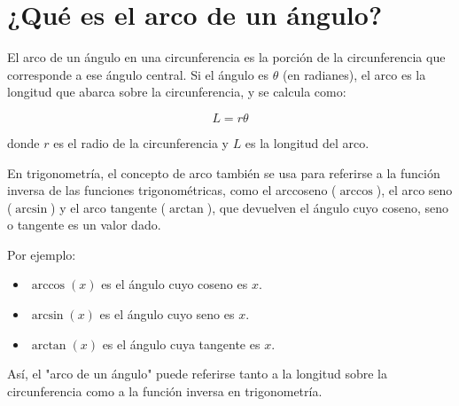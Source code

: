 \section{¿Qué es el arco de un ángulo?}\label{sec:arcoangulo}

El arco de un ángulo en una circunferencia es la porción de la circunferencia que corresponde a ese ángulo central. Si el ángulo es $\theta$ (en radianes), el arco es la longitud que abarca sobre la circunferencia, y se calcula como:

\[
    L = r \theta
\]

donde $r$ es el radio de la circunferencia y $L$ es la longitud del arco.

En trigonometría, el concepto de arco también se usa para referirse a la función inversa de las funciones trigonométricas, como el arccoseno ($\arccos$), el arco seno ($\arcsin$) y el arco tangente ($\arctan$), que devuelven el ángulo cuyo coseno, seno o tangente es un valor dado.

Por ejemplo:
\begin{itemize}
    \item $\arccos(x)$ es el ángulo cuyo coseno es $x$.
    \item $\arcsin(x)$ es el ángulo cuyo seno es $x$.
    \item $\arctan(x)$ es el ángulo cuya tangente es $x$.
\end{itemize}

Así, el "arco de un ángulo" puede referirse tanto a la longitud sobre la circunferencia como a la función inversa en trigonometría.

\begin{center}
\end{center}
